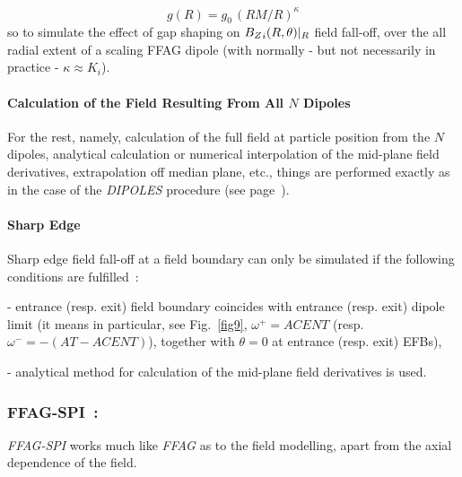 \begin{equation}
\label{EqggvsR}
g(R) = g_0 \, (RM/R)^{\kappa}
\end{equation}
%
\noindent  so to simulate the effect of gap shaping on $ {B_Z}_i(R,\theta)|_R$ field fall-off,  over the 
all radial extent of a scaling FFAG dipole (with normally - but not 
necessarily in practice - $\kappa \approx K_i$). 
 

\medskip

\paragraph{Calculation of the Field Resulting From All $N$ Dipoles}

For the rest, namely, calculation of the full field at particle position from the $N$ dipoles, 
analytical   calculation or numerical interpolation of the  mid-plane field derivatives, 
extrapolation off median plane, etc., things are performed exactly as in the case of the 
 \textsl{DIPOLES} procedure (see page~\pageref{FFatAP}). 




\medskip

\paragraph{Sharp Edge} 

\noindent Sharp edge field fall-off at a field boundary  can only be simulated if the following conditions are fulfilled~: 

- entrance (resp. exit)  field boundary  coincides with entrance (resp. exit) 
dipole limit (it means in particular, see Fig.~\ref{fig9},  
$\omega^+= ACENT$ (resp. $\omega^- = -(AT-ACENT)$), 
together with $\theta=0$ at entrance (resp. exit) EFBs), 

- analytical method for calculation of the  mid-plane field derivatives is used. 







\newpage


\subsubsection*{FFAG-SPI~: \FFAGSPITitl~\cite{reportICFAFFAG,reportNIMFFAGSPI}} \label{FFAG-SPI} 
\medskip

\noindent \textsl{FFAG-SPI} works much like \textsl{FFAG}  
as to the field modelling, apart from the axial  dependence of the field. 

